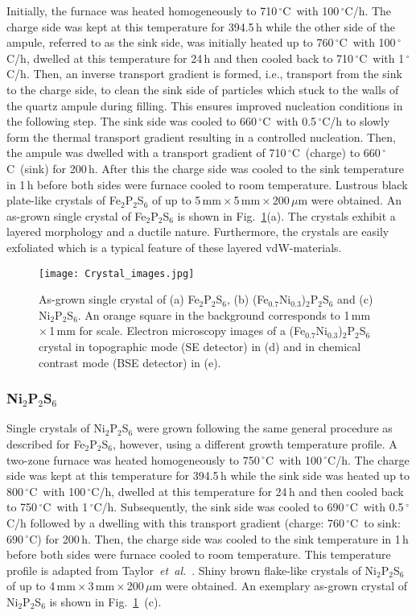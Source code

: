\documentclass[twocolumn,superscriptaddress,prb,preprintnumbers,nobibnotes,aps]{revtex4-2}  %
\newcommand{\gc}{$^\circ$C}
\begin{document}
Initially, the furnace was heated homogeneously to 710\,\gc\ with 100\,\gc/h. The charge side was kept at this temperature for 394.5\,h while the other side of the ampule, referred to as the sink side, was initially heated up to 760\,\gc\ with 100\,\gc/h, dwelled at this temperature for 24\,h and then cooled back to 710\,\gc\ with 1\,\gc/h. Then, an inverse transport gradient is formed, i.e., transport from the sink to the charge side, to clean the sink side of particles which stuck to the walls of the quartz ampule during filling. This ensures improved nucleation conditions in the following step. The sink side was cooled to 660\,\gc\ with 0.5\,\gc/h to slowly form the thermal transport gradient resulting in a controlled nucleation. Then, the ampule was dwelled with a transport gradient of 710\,\gc\ (charge) to 660\,\gc\ (sink) for 200\,h. After this the charge side was cooled to the sink temperature in 1\,h before both sides were furnace cooled to room temperature. Lustrous black plate-like crystals of Fe$_2$P$_2$S$_6$ of up to 5\,mm\,$\times$\,5\,mm\,$\times$\,200\,$\mu$m were obtained. An as-grown single crystal of Fe$_2$P$_2$S$_6$ is shown in Fig.~\ref{fig:crystal_images}(a). The crystals exhibit a layered morphology and a ductile nature. Furthermore, the crystals are easily exfoliated which is a typical feature of these layered vdW-materials.

\begin{figure}[htb]
\texttt{[image: Crystal\_images.jpg]}
\caption{As-grown single crystal of (a) Fe$_2$P$_2$S$_6$, (b) (Fe$_{0.7}$Ni$_{0.3}$)$_2$P$_2$S$_6$ and (c) Ni$_2$P$_2$S$_6$. An orange square in the background corresponds to 1\,mm\,$\times$\,1\,mm for scale. Electron microscopy images of a (Fe$_{0.7}$Ni$_{0.3}$)$_2$P$_2$S$_6$ crystal in topographic mode (SE detector) in (d) and in chemical contrast mode (BSE detector) in (e).}
\label{fig:crystal_images}
\end{figure}

\subsubsection{Ni$_2$P$_2$S$_6$}

Single crystals of Ni$_2$P$_2$S$_6$ were grown following the same general procedure as described for Fe$_2$P$_2$S$_6$, however, using a different growth temperature profile. A two-zone furnace was heated homogeneously to 750\,\gc\ with 100\,\gc/h. The charge side was kept at this temperature for 394.5\,h while the sink side was heated up to 800\,\gc\ with 100\,\gc/h, dwelled at this temperature for 24\,h and then cooled back to 750\,\gc\ with 1\,\gc/h. Subsequently, the sink side was cooled to 690\,\gc\ with 0.5\,\gc/h followed by a dwelling with this transport gradient (charge: 760\,\gc\ to sink: 690\,\gc) for 200\,h. Then, the charge side was cooled to the sink temperature in 1\,h before both sides were furnace cooled to room temperature. This temperature profile is adapted from Taylor~\textit{et~al.}~\cite{Taylor1973}. Shiny brown flake-like crystals of Ni$_2$P$_2$S$_6$ of up to 4\,mm\,$\times$\,3\,mm\,$\times$\,200\,$\mu$m were obtained. An exemplary as-grown crystal of Ni$_2$P$_2$S$_6$ is shown in Fig.~\ref{fig:crystal_images}~(c).
\end{document}
